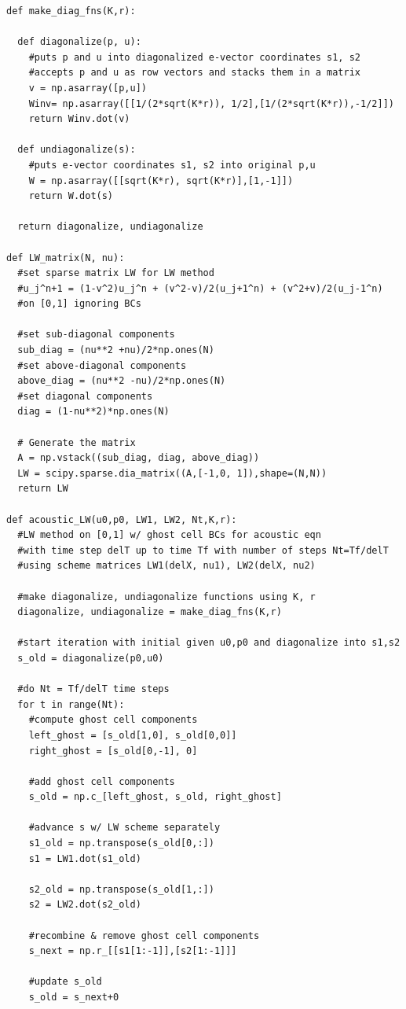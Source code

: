 \documentclass[12pt]{article}
\begin{document}
\begin{verbatim}
def make_diag_fns(K,r):

  def diagonalize(p, u):
    #puts p and u into diagonalized e-vector coordinates s1, s2
    #accepts p and u as row vectors and stacks them in a matrix
    v = np.asarray([p,u])
    Winv= np.asarray([[1/(2*sqrt(K*r)), 1/2],[1/(2*sqrt(K*r)),-1/2]])
    return Winv.dot(v)

  def undiagonalize(s):
    #puts e-vector coordinates s1, s2 into original p,u
    W = np.asarray([[sqrt(K*r), sqrt(K*r)],[1,-1]])
    return W.dot(s)

  return diagonalize, undiagonalize

def LW_matrix(N, nu):
  #set sparse matrix LW for LW method
  #u_j^n+1 = (1-v^2)u_j^n + (v^2-v)/2(u_j+1^n) + (v^2+v)/2(u_j-1^n)
  #on [0,1] ignoring BCs

  #set sub-diagonal components
  sub_diag = (nu**2 +nu)/2*np.ones(N)
  #set above-diagonal components
  above_diag = (nu**2 -nu)/2*np.ones(N)
  #set diagonal components
  diag = (1-nu**2)*np.ones(N)

  # Generate the matrix
  A = np.vstack((sub_diag, diag, above_diag))
  LW = scipy.sparse.dia_matrix((A,[-1,0, 1]),shape=(N,N))
  return LW

def acoustic_LW(u0,p0, LW1, LW2, Nt,K,r):
  #LW method on [0,1] w/ ghost cell BCs for acoustic eqn
  #with time step delT up to time Tf with number of steps Nt=Tf/delT
  #using scheme matrices LW1(delX, nu1), LW2(delX, nu2)

  #make diagonalize, undiagonalize functions using K, r
  diagonalize, undiagonalize = make_diag_fns(K,r)

  #start iteration with initial given u0,p0 and diagonalize into s1,s2
  s_old = diagonalize(p0,u0)

  #do Nt = Tf/delT time steps
  for t in range(Nt):
    #compute ghost cell components
    left_ghost = [s_old[1,0], s_old[0,0]]
    right_ghost = [s_old[0,-1], 0]
    
    #add ghost cell components
    s_old = np.c_[left_ghost, s_old, right_ghost]
    
    #advance s w/ LW scheme separately
    s1_old = np.transpose(s_old[0,:])
    s1 = LW1.dot(s1_old)
    
    s2_old = np.transpose(s_old[1,:])
    s2 = LW2.dot(s2_old)
    
    #recombine & remove ghost cell components
    s_next = np.r_[[s1[1:-1]],[s2[1:-1]]]

    #update s_old
    s_old = s_next+0


\end{verbatim}
\end{document}
